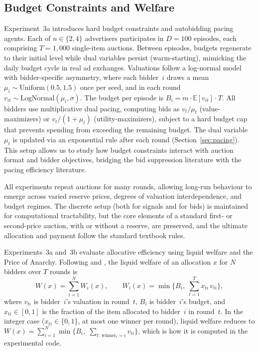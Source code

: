 \subsection{Budget Constraints and Welfare}

Experiment~3a introduces hard budget constraints and autobidding pacing agents. Each of $n \in \{2, 4\}$ advertisers participates in $D = 100$ episodes, each comprising $T = 1{,}000$ single-item auctions. Between episodes, budgets regenerate to their initial level while dual variables persist (warm-starting), mimicking the daily budget cycle in real ad exchanges. Valuations follow a log-normal model with bidder-specific asymmetry, where each bidder~$i$ draws a mean $\mu_i \sim \mathrm{Uniform}(0.5, 1.5)$ once per seed, and in each round $v_{it} \sim \mathrm{LogNormal}(\mu_i, \sigma)$. The budget per episode is $B_i = m \cdot \mathbb{E}[v_{it}] \cdot T$. All bidders use multiplicative dual pacing, computing bids as $v_t / \mu_t$ (value-maximizers) or $v_t / (1 + \mu_t)$ (utility-maximizers), subject to a hard budget cap that prevents spending from exceeding the remaining budget. The dual variable $\mu_t$ is updated via an exponential rule after each round (Section~\ref{sec:pacing}). This setup allows us to study how budget constraints interact with auction format and bidder objectives, bridging the bid suppression literature with the pacing efficiency literature.

All experiments repeat auctions for many rounds, allowing long-run behaviour to emerge across varied reserve prices, degrees of valuation interdependence, and budget regimes. The discrete setup (both for signals and for bids) is maintained for computational tractability, but the core elements of a standard first- or second-price auction, with or without a reserve, are preserved, and the ultimate allocation and payment follow the standard textbook rules.

\label{sec:welfare}

Experiments~3a and~3b evaluate allocative efficiency using liquid welfare and the Price of Anarchy. Following \citet{Gaitonde2023} and \citet{Deng2021TowardsEfficient}, the liquid welfare of an allocation $x$ for $N$ bidders over $T$ rounds is
\begin{equation}
  W(x) = \sum_{i=1}^{N} W_i(x), \qquad
  W_i(x) = \min\!\Big\{B_i,\; \sum_{t=1}^{T} x_{ti}\, v_{ti}\Big\},
  \label{eq:liquid_welfare_def}
\end{equation}
where $v_{ti}$ is bidder~$i$'s valuation in round~$t$, $B_i$ is bidder~$i$'s budget, and $x_{ti} \in [0,1]$ is the fraction of the item allocated to bidder~$i$ in round~$t$. In the integer case ($x_{ti} \in \{0,1\}$, at most one winner per round), liquid welfare reduces to $W(x) = \sum_{i=1}^{N} \min\{B_i,\; \sum_{t:\, \text{winner}_t = i} v_{ti}\}$, which is how it is computed in the experimental code.

